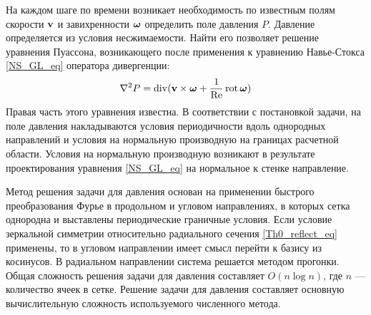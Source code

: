 На каждом шаге по времени возникает необходимость по известным полям скорости $\mathbf{v}$ и завихренности $\mbox{\boldmath$\omega$}$ определить поле давления $P$. Давление определяется из условия несжимаемости. Найти его позволяет решение уравнения Пуассона, возникающего после применения к уравнению Навье-Стокса \eqref{NS_GL_eq} оператора дивергенции:
\begin{equation}\label{pressure_eq}
\nabla^2 P = \operatorname{div}(\mathbf{v} \times \mbox{\boldmath$\omega$}  + \frac{1}{\operatorname{Re}} \operatorname{rot} \mbox{\boldmath$\omega$})
\end{equation}
Правая часть этого уравнения известна. В соответствии с постановкой задачи, на поле давления накладываются условия периодичности вдоль однородных направлений и условия на нормальную производную на границах расчетной области. Условия на нормальную производную возникают в результате проектирования уравнения \eqref{NS_GL_eq} на нормальное к стенке направление. 


Метод решения задачи для давления основан на применении быстрого преобразования Фурье в продольном и угловом направлениях, в которых сетка однородна и выставлены периодические граничные условия. Если условие зеркальной симметрии относительно радиального сечения \eqref{Th0_reflect_eq} применены, то в угловом направлении имеет смысл перейти к базису из косинусов. В радиальном направлении система решается методом прогонки. Общая сложность решения задачи для давления составляет $O(n \log n)$, где $n$ --- количество ячеек в сетке. Решение задачи для давления составляет основную вычислительную сложность используемого численного метода. 




